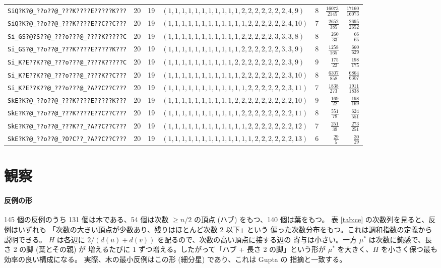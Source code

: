 \documentclass[paper=a4,fontsize=10.5pt,jafontsize=10.5pt]{jlreq}
\theoremstyle{plain}
\theoremstyle{definition}
\begin{document}
\begin{table}[htbp]
\begin{tabular}{llrlrrr}
\texttt{SiQ?K?@\_??o??@\_???K????E?????K???} & 20 & 19 & $(1,1,1,1,1,1,1,1,1,1,1,2,2,2,2,2,2,2,4,9)$ & 8 & $\frac{16073}{2145}$ & $\frac{17160}{16073}$ \\
\texttt{SiQ?K?@\_??o??@\_???K????E??C??C???} & 20 & 19 & $(1,1,1,1,1,1,1,1,1,1,1,1,2,2,2,2,2,2,4,10)$ & 7 & $\frac{2652}{385}$ & $\frac{2695}{2652}$ \\
\texttt{Si\_GS?@?S??@\_???o???@\_????K?????C} & 20 & 19 & $(1,1,1,1,1,1,1,1,1,1,1,2,2,2,2,2,3,3,3,8)$ & 8 & $\frac{260}{33}$ & $\frac{66}{65}$ \\
\texttt{Si\_GS?@\_??o??@\_???K????E?????K???} & 20 & 19 & $(1,1,1,1,1,1,1,1,1,1,1,2,2,2,2,2,2,3,3,9)$ & 8 & $\frac{1258}{165}$ & $\frac{660}{629}$ \\
\texttt{Si\_K?E??K??@\_???o???@\_????K?????C} & 20 & 19 & $(1,1,1,1,1,1,1,1,1,1,2,2,2,2,2,2,2,2,3,9)$ & 9 & $\frac{175}{22}$ & $\frac{198}{175}$ \\
\texttt{Si\_K?E??K??@\_???o???@\_????K??C???} & 20 & 19 & $(1,1,1,1,1,1,1,1,1,1,1,2,2,2,2,2,2,2,3,10)$ & 8 & $\frac{6307}{858}$ & $\frac{6864}{6307}$ \\
\texttt{Si\_K?E??K??@\_???o???@\_?A??C??C???} & 20 & 19 & $(1,1,1,1,1,1,1,1,1,1,1,1,2,2,2,2,2,2,3,11)$ & 7 & $\frac{1838}{273}$ & $\frac{1911}{1838}$ \\
\texttt{SkE?K?@\_??o??@\_???K????E?????K???} & 20 & 19 & $(1,1,1,1,1,1,1,1,1,1,2,2,2,2,2,2,2,2,2,10)$ & 9 & $\frac{169}{22}$ & $\frac{198}{169}$ \\
\texttt{SkE?K?@\_??o??@\_???K????E??C??C???} & 20 & 19 & $(1,1,1,1,1,1,1,1,1,1,1,2,2,2,2,2,2,2,2,11)$ & 8 & $\frac{551}{78}$ & $\frac{624}{551}$ \\
\texttt{SkE?K?@\_??o??@\_???K??\_?A??C??C???} & 20 & 19 & $(1,1,1,1,1,1,1,1,1,1,1,1,2,2,2,2,2,2,2,12)$ & 7 & $\frac{251}{39}$ & $\frac{273}{251}$ \\
\texttt{SkE?K?@\_??o??@\_?O?C??\_?A??C??C???} & 20 & 19 & $(1,1,1,1,1,1,1,1,1,1,1,1,1,2,2,2,2,2,2,13)$ & 6 & $\frac{29}{5}$ & $\frac{30}{29}$ \\
\bottomrule
\end{tabular}
\end{table}

\section{観察}

\paragraph{反例の形}
145 個の反例のうち 131 個は木である、54 個は次数 $\ge n/2$ の頂点 (ハブ) をもつ、140 個は葉をもつ。
表 \ref{tab:ce} の次数列を見ると、反例はいずれも
「次数の大きい頂点が少数あり、残りはほとんど次数 2 以下」という
偏った次数分布をもつ。これは調和指数の定義から説明できる。
$H$ は各辺に $2/(d(u)+d(v))$ を配るので、次数の高い頂点に接する辺の
寄与は小さい。一方 $\mu^*$ は次数に鈍感で、長さ 2 の脚 (葉とその親) が
増えるたびに 1 ずつ増える。したがって「ハブ + 長さ 2 の脚」という形が
$\mu^*$ を大きく、$H$ を小さく保つ最も効率の良い構成になる。
実際、木の最小反例はこの形 (細分星) であり、これは Gupta \cite{gupta} の
指摘と一致する。
\end{document}
